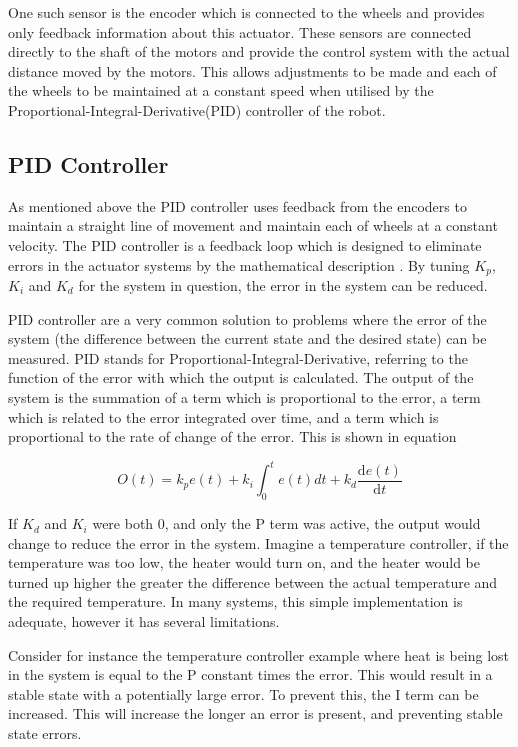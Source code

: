 One such sensor is the encoder which is connected to the wheels and provides only feedback information about this actuator. These sensors are connected directly to the shaft of the motors and provide the control system with the actual distance moved by the motors. This allows adjustments to be made and each of the wheels to be maintained at a constant speed when utilised by the Proportional-Integral-Derivative(PID) controller of the robot.  

\subsection{PID Controller}\label{litreview/robotics/pid}
As mentioned above the PID controller uses feedback from the encoders to maintain a straight line of movement and maintain each of wheels at a constant velocity. The PID controller is a feedback loop which is designed to eliminate errors in the actuator systems by the mathematical description . By tuning $ K_p $, $ K_i $ and $ K_d $ for the system in question, the error in the system can be reduced.   

PID controller are a very common solution to problems where the error of the system (the difference between the current state and the desired state) can be measured. PID stands for Proportional-Integral-Derivative, referring to the function of the error with which the output is calculated. The output of the system is the summation of a term which is proportional to the error, a term which is related to the error integrated over time, and a term which is proportional to the rate of change of the error. This is shown in equation 

$$ O(t) = k_{p}e(t) + k_i\int_{0}^{t}e(t)dt + k_d \frac{\mathrm{d} e(t) }{\mathrm{d} t}$$

If $K_d$ and $K_i$ were both 0, and only the P term was active, the output would change to reduce the error in the system. Imagine a temperature controller, if the temperature was too low, the heater would turn on, and the heater would be turned up higher the greater the difference between the actual temperature and the required temperature. In many systems, this simple implementation is adequate, however it has several limitations. 

Consider for instance the temperature controller example where heat is being lost in the system is equal to the P constant times the error. This would result in a stable state with a potentially large error. To prevent this, the I term can be increased. This will increase the longer an error is present, and preventing stable state errors. 

